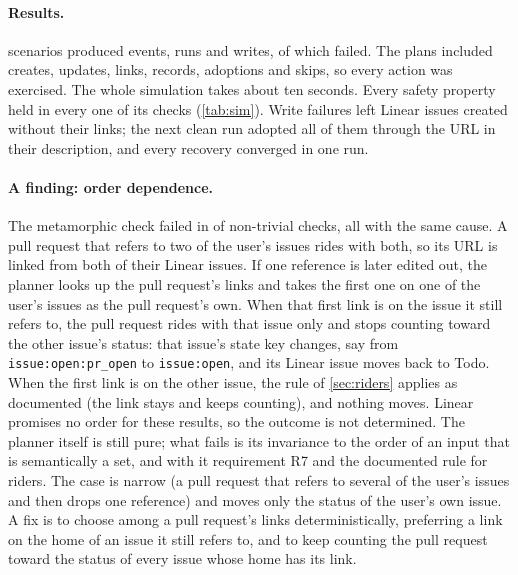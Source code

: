 \documentclass[11pt,a4paper]{article}
\newcommand{\key}[1]{\texttt{#1}}
\newcommand{\status}[1]{\textsf{#1}}
\begin{document}
\paragraph{Results.} \SimScenarios{} scenarios produced \SimEvents{} events, \SimRuns{} runs and
\SimWrites{} writes, of which \SimFaultsInjected{} failed. The plans included
\SimActionCreate{} creates, \SimActionUpdate{} updates, \SimActionLink{} links,
\SimActionRecord{} records, \SimActionAdopt{} adoptions and \SimActionSkip{} skips, so every
action was exercised. The whole simulation takes about ten seconds. Every safety property held
in every one of its \SimSafetyChecks{} checks (\cref{tab:sim}). Write failures left
\SimOrphans{} Linear issues created without their links; the next clean run adopted all
\SimOrphansAdopted{} of them through the URL in their description, and every recovery converged
in one run.

\paragraph{A finding: order dependence.}
\label{sec:eval-order}
The metamorphic check failed in \SimViolationsOrderIndependent{} of \SimChecksOrderIndependent{}
non-trivial checks, all with the same cause. A pull request that refers to two of the user's
issues rides with both, so its URL is linked from both of their Linear issues. If one reference
is later edited out, the planner looks up the pull request's links and takes the first one on
one of the user's issues as the pull request's own. When that first link is on the issue it still refers
to, the pull request rides with that issue only and stops counting toward the other issue's
status: that issue's state key changes, say from \key{issue:open:pr\_open} to \key{issue:open},
and its Linear issue moves back to \status{Todo}. When the first link is on the other issue, the
rule of \cref{sec:riders} applies as documented (the link stays and keeps counting), and nothing
moves. Linear promises no order for these results, so the outcome is not determined. The
planner itself is still pure; what fails is its invariance to the order of an input that is
semantically a set, and with it requirement R7 and the documented rule for riders. The case is
narrow (a pull request that refers to several of the user's issues and then drops one
reference) and moves only the status of the user's own issue. A fix is to choose among a pull
request's links deterministically, preferring a link on the home of an issue it still refers
to, and to keep counting the pull request toward the status of every issue whose home has its
link.
\end{document}
